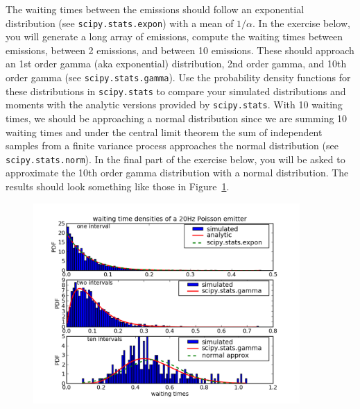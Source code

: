 The waiting times between the emissions should follow an exponential
distribution (see \texttt{scipy.stats.expon}) with a mean of
$1/\alpha$.  In the exercise below, you will generate a long array of
emissions, compute the waiting times between emissions, between 2
emissions, and between 10 emissions.  These should approach an 1st
order gamma (aka exponential) distribution, 2nd order gamma, and 10th
order gamma (see \texttt{scipy.stats.gamma}).  Use the probability
density functions for these distributions in \texttt{scipy.stats} to
compare your simulated distributions and moments with the analytic
versions provided by \texttt{scipy.stats}.  With 10 waiting times, we
should be approaching a normal distribution since we are summing 10
waiting times and under the central limit theorem the sum of
independent samples from a finite variance process approaches the
normal distribution (see \texttt{scipy.stats.norm}).  In the final
part of the exercise below, you will be asked to approximate the 10th
order gamma distribution with a normal distribution.  The results
should look something like those in
Figure~\ref{fig:stats_distributions}.



\begin{figure}
\begin{centering}\includegraphics[width=4in]{fig/stats_distributions}\par\end{centering}

\caption{\label{fig:stats_distributions}}
\end{figure}
